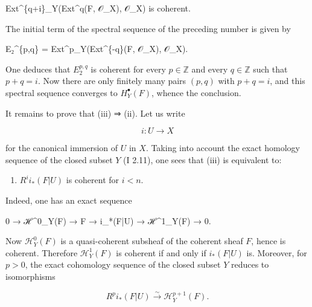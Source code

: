\documentclass[
  11pt,
  a4paper,
]{book}
\newenvironment{Shaded}{}{}
\newcommand{\NormalTok}[1]{#1}
\providecommand{\tightlist}{%
  \setlength{\itemsep}{0pt}\setlength{\parskip}{0pt}}
\begin{document}
\begin{Shaded}
\begin{Highlighting}[]
\NormalTok{Ext\^{}\{q+i\}\_Y(Ext\^{}q(F, 𝒪\_X), 𝒪\_X)    is coherent.}
\end{Highlighting}
\end{Shaded}

The initial term of the spectral sequence of the preceding number is
given by

\begin{Shaded}
\begin{Highlighting}[]
\NormalTok{E₂\^{}\{p,q\} = Ext\^{}p\_Y(Ext\^{}\{{-}q\}(F, 𝒪\_X), 𝒪\_X).}
\end{Highlighting}
\end{Shaded}

One deduces that \(E^{p,q}_{2}\) is coherent for every
\(p \in \mathbb{Z}\) and every \(q \in \mathbb{Z}\) such that \(p + q =
i\). Now there are only finitely many pairs \((p, q)\) with
\(p + q = i\), and this spectral sequence converges to
\(H^{\bullet}_{Y}(F)\), whence the conclusion.

It remains to prove that (iii) ⇒ (ii). Let us write

\[ i : U \to X \]

for the canonical immersion of \(U\) in \(X\). Taking into account the
exact homology sequence of the closed subset \(Y\) (I 2.11), one sees
that (iii) is equivalent to:

\begin{enumerate}
\def\labelenumi{(\roman{enumi})}
\setcounter{enumi}{3}
\tightlist
\item
  \(R^{i} i_{*}(F|U)\) is coherent for \(i < n\).
\end{enumerate}

Indeed, one has an exact sequence

\begin{Shaded}
\begin{Highlighting}[]
\NormalTok{0 → ℋ\^{}0\_Y(F) → F → i\_*(F|U) → ℋ\^{}1\_Y(F) → 0.}
\end{Highlighting}
\end{Shaded}

Now \(\mathcal{H}^{0}_{Y}(F)\) is a quasi-coherent subsheaf of the
coherent sheaf \(F\), hence is coherent. Therefore
\(\mathcal{H}^{1}_{Y}(F)\) is coherent if and only if \(i_{*}(F|U)\) is.
Moreover, for \(p > 0\), the exact cohomology sequence of the closed
subset \(Y\) reduces to isomorphisms

\[ R^{p} i_{*}(F|U) \xrightarrow{\sim} \mathcal{H}^{p+1}_{Y}(F). \]
\end{document}
